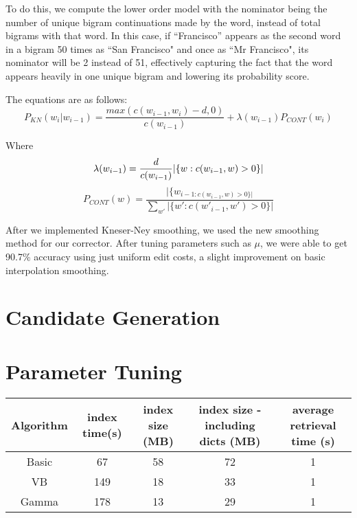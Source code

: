 \documentclass[10pt]{article}
\begin{document}
To do this, we compute the lower order model with the nominator being the number of unique bigram continuations made by the word, instead of total bigrams with that word. In this case, if ``Francisco'' appears as the second word in a bigram 50 times as ``San Francisco" and once as ``Mr Francisco", its nominator will be 2 instead of 51, effectively capturing the fact that the word appears heavily in one unique bigram and lowering its probability score.

The equations are as follows:
\begin{equation}
P_{KN}(w_i|w_{i-1})=\frac{max(c(w_{i-1},w_i)-d,0)}{c(w_{i-1})}+\lambda(w_{i-1})P_{CONT}(w_i)
\end{equation}

Where
\begin{equation}
\lambda(w_{i-1}) = \frac{d}{c(w_{i-1})}|\{w:c(w_{i-1},w)>0\}|\\
\end{equation}
\begin{equation}
P_{CONT}(w) = \frac{|\{w_{i-1:c(w_{i-1},w)>0\}|}}{\sum_{w'}|\{w':c(w'_{i-1},w')>0\}|}
\end{equation}

After we implemented Kneser-Ney smoothing, we used the new smoothing method for our corrector. After tuning parameters such as $\mu$, we were able to get 90.7\% accuracy using just uniform edit costs, a slight improvement on basic interpolation smoothing. 

\section{Candidate Generation}


\section{Parameter Tuning}
\begin{table}[ht]
\begin{tabular}{| c | c | c | c | c |}
\hline
Algorithm & index time(s) & index size (MB) & index size - including dicts (MB) & average retrieval time (s)\\\hline
Basic & 67 & 58 & 72 & 1\\\hline
VB & 149 & 18 & 33 & 1\\\hline
Gamma & 178 & 13 & 29 & 1\\\hline
\end{tabular}
\end{table}



\end{document}
